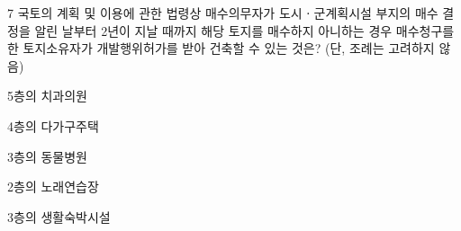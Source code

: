\begin{question}{7}
국토의 계획 및 이용에 관한 법령상 매수의무자가 도시ㆍ군계획시설 부지의 매수 결정을 알린 날부터 2년이 지날 때까지 해당 토지를 매수하지 아니하는 경우 매수청구를 한 토지소유자가 개발행위허가를 받아 건축할 수 있는 것은? (단, 조례는 고려하지 않음)
\begin{choices}
  \item 5층의 치과의원
  \item 4층의 다가구주택
  \item 3층의 동물병원
  \item 2층의 노래연습장
  \item 3층의 생활숙박시설
\end{choices}
\end{question}
